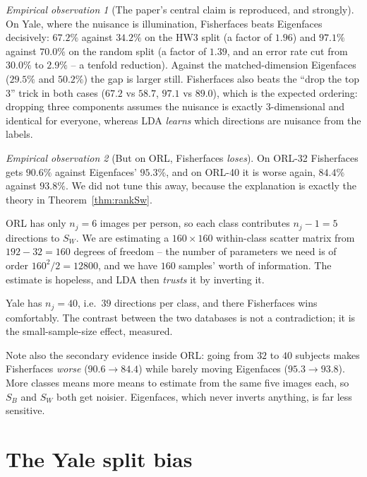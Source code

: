 \documentclass[11pt]{article}
\theoremstyle{definition}
\theoremstyle{remark}
\newtheorem*{observation}{Empirical observation}
\newcommand{\Sw}{S_W}
\newcommand{\Sb}{S_B}
\begin{document}
\begin{observation}[The paper's central claim is reproduced, and strongly]
On Yale, where the nuisance is illumination, Fisherfaces beats Eigenfaces
decisively: $\mathbf{67.2\%}$ against $\mathbf{34.2\%}$ on the HW3 split (a factor
of $1.96$) and $\mathbf{97.1\%}$ against $\mathbf{70.0\%}$ on the random split (a
factor of $1.39$, and an error rate cut from $30.0\%$ to $2.9\%$ -- a tenfold
reduction). Against the
matched-dimension Eigenfaces ($29.5\%$ and $50.2\%$) the gap is larger still.
Fisherfaces also beats the ``drop the top 3'' trick in both cases
($67.2$ vs $58.7$, $97.1$ vs $89.0$), which is the expected ordering: dropping
three components assumes the nuisance is exactly 3-dimensional and identical for
everyone, whereas LDA \emph{learns} which directions are nuisance from the labels.
\end{observation}

\begin{observation}[But on ORL, Fisherfaces \emph{loses}]
On ORL-32 Fisherfaces gets $90.6\%$ against Eigenfaces' $95.3\%$, and on ORL-40 it
is worse again, $84.4\%$ against $93.8\%$. We did not tune this away, because the
explanation is exactly the theory in Theorem~\ref{thm:rankSw}.

ORL has only $n_j=6$ images per person, so each class contributes $n_j-1=5$
directions to $\Sw$. We are estimating a $160\times160$ within-class scatter matrix
from $192-32=160$ degrees of freedom -- the number of parameters we need is of order
$160^2/2 = 12800$, and we have $160$ samples' worth of information. The estimate is
hopeless, and LDA then \emph{trusts} it by inverting it.

Yale has $n_j=40$, i.e.\ $39$ directions per class, and there Fisherfaces wins
comfortably. The contrast between the two databases is not a contradiction; it is
the small-sample-size effect, measured.

Note also the secondary evidence inside ORL: going from $32$ to $40$ subjects makes
Fisherfaces \emph{worse} ($90.6\to84.4$) while barely moving Eigenfaces
($95.3\to93.8$). More classes means more means to estimate from the same five
images each, so $\Sb$ and $\Sw$ both get noisier. Eigenfaces, which never inverts
anything, is far less sensitive.
\end{observation}

\section{The Yale split bias}
\label{sec:splitbias}
\end{document}
